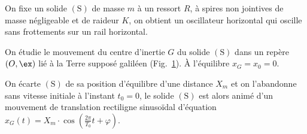 \begin{minipage}{0.65\linewidth}
    On fixe un solide $\mathrm{(S)}$ de masse $m$ à un ressort $R$, à spires non
    jointives de masse négligeable et de raideur $K$, on obtient un oscillateur
    horizontal qui oscille sans frottements sur un rail horizontal.
    
    On étudie le mouvement du centre d'inertie $G$ du solide $\mathrm{(S)}$ dans
    un repère $(O,\ex)$ lié à la Terre supposé galiléen
    (Fig.~\ref{fig:solide_ressort}). À l'équilibre $x_{G}=x_{0}=0$.
\end{minipage}
\hfill
\begin{minipage}{0.34\linewidth}
    \begin{figure}[H]
        \centering
        
        \caption{}
        \label{fig:solide_ressort}
    \end{figure}
\end{minipage}

On écarte $\mathrm{(S)}$ de sa position d'équilibre d'une distance $X_{m}$ et on
l'abandonne sans vitesse initiale à l'instant $t_{0}=0$, le solide
$\mathrm{(S)}$ est alors animé d'un mouvement de translation rectiligne
sinusoïdal d'équation
${x_{G}(t)=X_{m}\cdot\cos\left(\frac{2\pi}{T_{0}}t+\varphi\right)}$.

